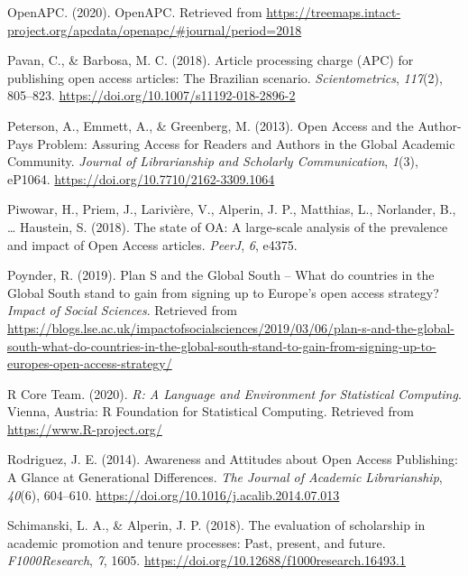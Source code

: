 \documentclass[
  english,
  man]{apa6}
\begin{document}
\leavevmode\hypertarget{ref-openapc_openapc_2020}{}%
OpenAPC. (2020). OpenAPC. Retrieved from \url{https://treemaps.intact-project.org/apcdata/openapc/\#journal/period=2018}

\leavevmode\hypertarget{ref-pavan_article_2018}{}%
Pavan, C., \& Barbosa, M. C. (2018). Article processing charge (APC) for publishing open access articles: The Brazilian scenario. \emph{Scientometrics}, \emph{117}(2), 805--823. \url{https://doi.org/10.1007/s11192-018-2896-2}

\leavevmode\hypertarget{ref-peterson_open_2013}{}%
Peterson, A., Emmett, A., \& Greenberg, M. (2013). Open Access and the Author-Pays Problem: Assuring Access for Readers and Authors in the Global Academic Community. \emph{Journal of Librarianship and Scholarly Communication}, \emph{1}(3), eP1064. \url{https://doi.org/10.7710/2162-3309.1064}

\leavevmode\hypertarget{ref-piwowar_state_2018}{}%
Piwowar, H., Priem, J., Larivière, V., Alperin, J. P., Matthias, L., Norlander, B., \ldots{} Haustein, S. (2018). The state of OA: A large-scale analysis of the prevalence and impact of Open Access articles. \emph{PeerJ}, \emph{6}, e4375.

\leavevmode\hypertarget{ref-poynder_plan_2019}{}%
Poynder, R. (2019). Plan S and the Global South -- What do countries in the Global South stand to gain from signing up to Europe's open access strategy? \emph{Impact of Social Sciences}. Retrieved from \url{https://blogs.lse.ac.uk/impactofsocialsciences/2019/03/06/plan-s-and-the-global-south-what-do-countries-in-the-global-south-stand-to-gain-from-signing-up-to-europes-open-access-strategy/}

\leavevmode\hypertarget{ref-r_core_team_r_2020}{}%
R Core Team. (2020). \emph{R: A Language and Environment for Statistical Computing}. Vienna, Austria: R Foundation for Statistical Computing. Retrieved from \url{https://www.R-project.org/}

\leavevmode\hypertarget{ref-rodriguez_awareness_2014}{}%
Rodriguez, J. E. (2014). Awareness and Attitudes about Open Access Publishing: A Glance at Generational Differences. \emph{The Journal of Academic Librarianship}, \emph{40}(6), 604--610. \url{https://doi.org/10.1016/j.acalib.2014.07.013}

\leavevmode\hypertarget{ref-schimanski_evaluation_2018}{}%
Schimanski, L. A., \& Alperin, J. P. (2018). The evaluation of scholarship in academic promotion and tenure processes: Past, present, and future. \emph{F1000Research}, \emph{7}, 1605. \url{https://doi.org/10.12688/f1000research.16493.1}
\end{document}
